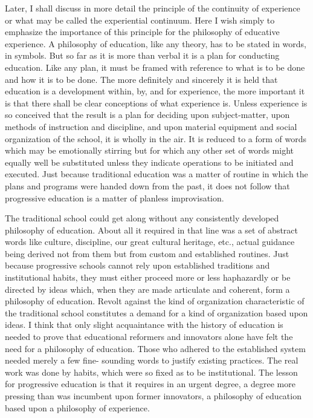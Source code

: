 Later, I shall discuss in more detail the principle of the continuity of experience or 
what may be called the experiential continuum. Here I wish simply to emphasize the 
importance of this principle for the philosophy of educative experience. A philosophy of 
education, like any theory, has to be stated in words, in symbols. But so far as it is more 
than verbal it is a plan for conducting education. Like any plan, it must be framed with reference to what is to be done and how it is to be done. The more definitely and 
sincerely it is held that education is a development within, by, and for experience, the 
more important it is that there shall be clear conceptions of what experience is. Unless 
experience is so conceived that the result is a plan for deciding upon subject-matter, upon 
methods of instruction and discipline, and upon material equipment and social 
organization of the school, it is wholly in the air. It is reduced to a form of words which 
may be emotionally stirring but for which any other set of words might equally well be 
substituted unless they indicate operations to be initiated and executed. Just because 
traditional education was a matter of routine in which the plans and programs were 
handed down from the past, it does not follow that progressive education is a matter of 
planless improvisation. 

The traditional school could get along without any consistently developed philosophy 
of education. About all it required in that line was a set of abstract words like culture, 
discipline, our great cultural heritage, etc., actual guidance being derived not from them 
but from custom and established routines. Just because progressive schools cannot rely 
upon established traditions and institutional habits, they must either proceed more or less 
haphazardly or be directed by ideas which, when they are made articulate and coherent, 
form a philosophy of education. Revolt against the kind of organization characteristic of 
the traditional school constitutes a demand for a kind of organization based upon ideas. I 
think that only slight acquaintance with the history of education is needed to prove that 
educational reformers and innovators alone have felt the need for a philosophy of 
education. Those who adhered to the established system needed merely a few fine- 
sounding words to justify existing practices. The real work was done by habits, which 
were so fixed as to be institutional. The lesson for progressive education is that it requires 
in an urgent degree, a degree more pressing than was incumbent upon former innovators, 
a philosophy of education based upon a philosophy of experience. 

